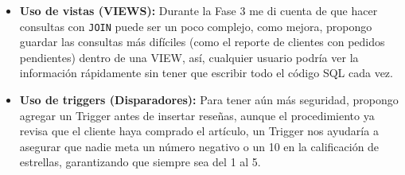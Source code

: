 \documentclass[10pt,letterpaper]{article}
\begin{document}
\begin{itemize}
    \item \textbf{Uso de vistas (VIEWS):} Durante la Fase 3 me di cuenta de que hacer consultas con \texttt{JOIN} puede ser un poco complejo, como mejora, propongo guardar las consultas m\'as dif\'iciles (como el reporte de clientes con pedidos pendientes) dentro de una VIEW, as\'i, cualquier usuario podr\'ia ver la informaci\'on r\'apidamente sin tener que escribir todo el c\'odigo SQL cada vez.
    \item \textbf{Uso de triggers (Disparadores):} Para tener a\'un m\'as seguridad, propongo agregar un Trigger antes de insertar rese\~nas, aunque el procedimiento ya revisa que el cliente haya comprado el art\'iculo, un Trigger nos ayudar\'ia a asegurar que nadie meta un n\'umero negativo o un 10 en la calificaci\'on de estrellas, garantizando que siempre sea del 1 al 5.
\end{itemize}
\end{document}
